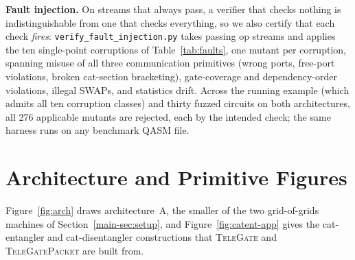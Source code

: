 \documentclass[journal]{IEEEtran}
\newcommand{\TeleGate}{\textsc{TeleGate}}
\newcommand{\TeleGatePacket}{\textsc{TeleGatePacket}}
\newcommand{\mainSetup}{Section~\ref{main-sec:setup}}
\begin{document}
\textbf{Fault injection.} On streams that always pass, a verifier
that checks nothing is indistinguishable from one that checks
everything, so we also certify that each check \emph{fires}:
\texttt{verify\_fault\_injection.py} takes passing op streams and
applies the ten single-point corruptions of Table~\ref{tab:faults},
one mutant per corruption, spanning misuse of all three communication
primitives (wrong ports, free-port violations, broken cat-section
bracketing), gate-coverage and dependency-order violations, illegal
SWAPs, and statistics drift. Across the running example (which
admits all ten corruption classes) and thirty fuzzed circuits on both
architectures, all 276 applicable mutants are rejected, each by the
intended check; the same harness runs on any benchmark QASM file.

\section{Architecture and Primitive Figures}
\label{app:catent}

Figure~\ref{fig:arch} draws architecture~A, the smaller of the two
grid-of-grids machines of \mainSetup{}, and Figure~\ref{fig:catent-app}
gives the cat-entangler and cat-disentangler constructions that
\TeleGate{} and \TeleGatePacket{} are built from.
\end{document}
